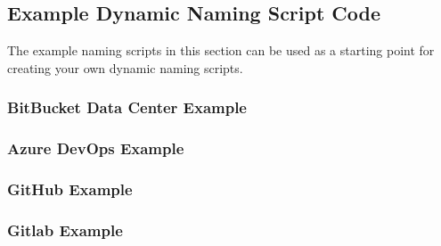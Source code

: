 \subsection{Example Dynamic Naming Script Code}

The example naming scripts in this section can be used as a starting point for creating your own
dynamic naming scripts.

\pagebreak
\subsubsection{BitBucket Data Center Example}


\pagebreak
\subsubsection{Azure DevOps Example}


\pagebreak
\subsubsection{GitHub Example}


\pagebreak
\subsubsection{Gitlab Example}




